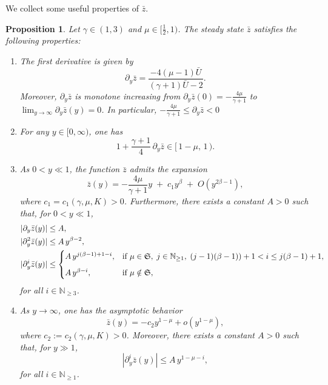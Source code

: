 \documentclass{article}
\newcommand{\ga}{\gamma}
\newcommand{\pa}{\partial}
\def\ssmu{\mathfrak S}
\numberwithin{equation}{section}
\newtheorem{proposition}[theorem]{Proposition}
\begin{document}
We collect some useful properties of $\bar z$.  
 \begin{proposition}\label{prop bar z}
Let $\gamma \in (1,3)$ and $\mu \in \bigl[\tfrac12,1\bigr)$.  
The steady state $\bar z$ satisfies the following properties:
\begin{enumerate}
    \item[$(1)$] The first derivative is given by
    \[
        \partial_y \bar z = \frac{-4(\mu-1)\bar U}{(\gamma+1)\bar U-2}.
    \]
    Moreover, $\partial_y \bar z$ is monotone increasing from $\partial_y \bar z(0)=-\frac{4\mu}{\ga+1}$ to $\lim_{y\to \infty} \pa_y \bar z(y)=0$. In particular, $ -\frac{4\mu}{\ga+1} \le \partial_y \bar z <0$
    
    \item[$(2)$] For any $y \in [0,\infty)$, one has
    \[
        1 + \frac{\gamma+1}{4}\,\partial_y \bar z \in [\,1-\mu,\,1\,).
    \]
    
    \item[$(3)$] As $0<y\ll 1$, the function $\bar z$ admits the expansion
    \begin{equation}\label{z y<<1}
        \bar z(y) = -\frac{4\mu}{\gamma+1} y \;+\; c_1 y^{\beta} 
        \;+\; O\!\left(y^{2\beta -1 }\right),
    \end{equation}
    where $c_1=c_1 (\ga,\mu,K)>0$.  %
    Furthermore, there exists a constant $A>0$ such that, for $0<y\ll 1$,
    \begin{align}
        |\partial_y \bar z(y)| &\leq A, \notag \\ 
        |\partial_y^2 \bar z(y)| &\leq A\, y^{\beta-2}, \notag \\
        |\partial_y^i \bar z(y)| &\leq 
        \begin{cases}
            A\, y^{j(\beta-1)+1-i}, 
            & \text{if } \mu\in \ssmu,\; j\in \mathbb N_{\geq 1},\; (j-1)(\beta-1))+1 < i \leq j(\beta-1)+1, \\[6pt]
            A\, y^{\beta-i}, 
            & \text{if } \mu \notin \ssmu,
        \end{cases}\label{payi z y<<1}
    \end{align}
    for all $i \in \mathbb N_{\geq 3}$.
    
    \item[$(4)$] As $y \to \infty$, one has the asymptotic behavior
    \begin{equation}\label{z y>>1}
        \bar z(y) = -c_2 y^{1-\mu} + o\!\left(y^{1-\mu}\right),
    \end{equation}
    where $c_2:=c_2(\ga,\mu,K)>0$. Moreover, there exists a constant $A>0$ such that, for $y \gg 1$,
    \begin{equation}\label{payi z y>>1}
        |\partial_y^i \bar z(y)| \leq A\, y^{1-\mu-i}, 
    \end{equation}
    for all $i \in \mathbb N_{\geq 1}$.
\end{enumerate}
\end{proposition}
\end{document}
